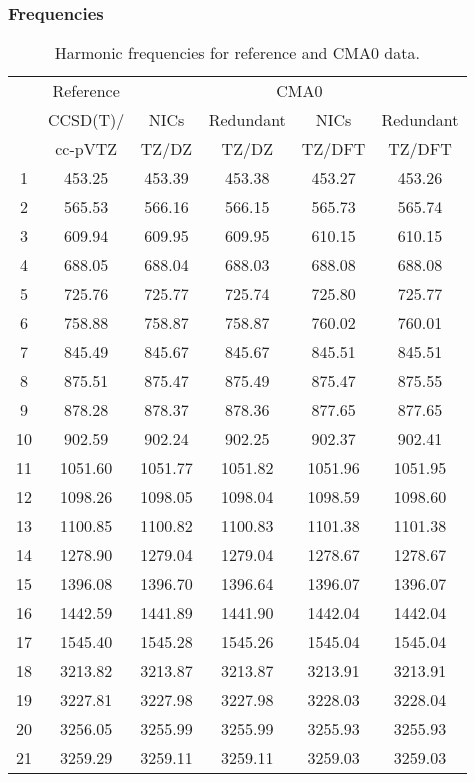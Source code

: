 \documentclass[10pt,oneside]{article}
\begin{document}
\begin{table}[h!]
\subsubsection*{Frequencies}
\centering
\caption{Harmonic frequencies for reference and CMA0 data.}
\begin{tabular}{cccccc}
\toprule
{} & Reference & \multicolumn{4}{c}{CMA0} \\
{} &  CCSD(T)/ &    NICs &  Redundant &    NICs & Redundant \\
{} &   cc-pVTZ &   TZ/DZ &      TZ/DZ &  TZ/DFT &    TZ/DFT \\
\midrule
1  &    453.25 &  453.39 &     453.38 &  453.27 &    453.26 \\
2  &    565.53 &  566.16 &     566.15 &  565.73 &    565.74 \\
3  &    609.94 &  609.95 &     609.95 &  610.15 &    610.15 \\
4  &    688.05 &  688.04 &     688.03 &  688.08 &    688.08 \\
5  &    725.76 &  725.77 &     725.74 &  725.80 &    725.77 \\
6  &    758.88 &  758.87 &     758.87 &  760.02 &    760.01 \\
7  &    845.49 &  845.67 &     845.67 &  845.51 &    845.51 \\
8  &    875.51 &  875.47 &     875.49 &  875.47 &    875.55 \\
9  &    878.28 &  878.37 &     878.36 &  877.65 &    877.65 \\
10 &    902.59 &  902.24 &     902.25 &  902.37 &    902.41 \\
11 &   1051.60 & 1051.77 &    1051.82 & 1051.96 &   1051.95 \\
12 &   1098.26 & 1098.05 &    1098.04 & 1098.59 &   1098.60 \\
13 &   1100.85 & 1100.82 &    1100.83 & 1101.38 &   1101.38 \\
14 &   1278.90 & 1279.04 &    1279.04 & 1278.67 &   1278.67 \\
15 &   1396.08 & 1396.70 &    1396.64 & 1396.07 &   1396.07 \\
16 &   1442.59 & 1441.89 &    1441.90 & 1442.04 &   1442.04 \\
17 &   1545.40 & 1545.28 &    1545.26 & 1545.04 &   1545.04 \\
18 &   3213.82 & 3213.87 &    3213.87 & 3213.91 &   3213.91 \\
19 &   3227.81 & 3227.98 &    3227.98 & 3228.03 &   3228.04 \\
20 &   3256.05 & 3255.99 &    3255.99 & 3255.93 &   3255.93 \\
21 &   3259.29 & 3259.11 &    3259.11 & 3259.03 &   3259.03 \\
\bottomrule
\end{tabular}
\end{table}
\end{document}
